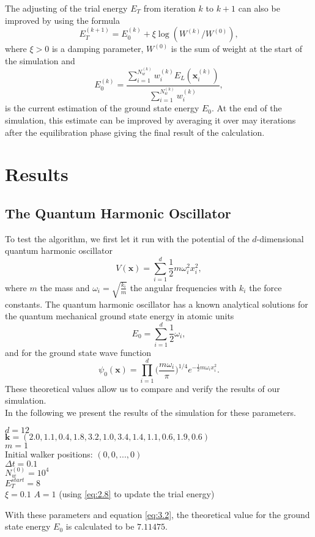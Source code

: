 \documentclass [12pt]{report}
\begin{document}
The adjusting of the trial energy $E_T$ from iteration $k$ to $k+1$ can also be improved by using the formula
\begin{equation}\label{eq:2.13} 
E_T^{(k+1)} = E_0^{(k)} + \xi \log(W^{(k)}/W^{(0)}),
\end{equation}
where $\xi > 0$ is a damping parameter, $W^{(0)}$ is the sum of weight at the start of the simulation and
\begin{equation}\label{eq:2.14} 
E_0^{(k)} = \frac{\sum_{i = 1}^{N_w^{(k)}} w_{i}^{(k)} E_L(\bm{x}_{i}^{(k)})}{\sum_{i = 1}^{N_w^{(k)}} w_{i}^{(k)} },
\end{equation}
is the current estimation of the ground state energy $E_0$. At the end of the simulation, this estimate can be improved by averaging it over may iterations after the equilibration phase giving the final result of the calculation.

\chapter{Results}
\section{The Quantum Harmonic Oscillator}
To test the algorithm, we first let it run with the potential of the $d$-dimensional quantum harmonic oscillator
\begin{equation}\label{eq:3.1} 
V(\bm{x}) = \sum_{i=1}^d \frac{1}{2} m \omega_i^2 x_i^2,
\end{equation}
where $m$ the mass and $\omega_i = \sqrt{\frac{k_i}{m}}$ the angular frequencies with $k_i$ the force constants. The quantum harmonic oscillator has a known analytical solutions for the quantum mechanical ground state energy in atomic units
\begin{equation}\label{eq:3.2} 
E_0 = \sum_{i=1}^d \frac{1}{2}\omega_i,
\end{equation}
and for the ground state wave function
\begin{equation}\label{eq:3.3} 
\psi_0(\bm{x}) = \prod_{i=1}^d \biggl(\frac{m \omega_i}{\pi}\biggr)^{1/4} e^{-\frac{1}{2} m \omega_i x_i^2}.
\end{equation}
These theoretical values allow us to compare and verify the results of our simulation.\\
In the following we present the results of the simulation for these parameters.

\begin{addmargin}[1cm]{1cm}
$d = 12$ \\
$\bm{k} = (2.0,  1.1,  0.4,  1.8,  3.2,  1.0,  3.4,  1.4,  1.1,  0.6,  1.9,  0.6 )$\\
$m =1$ \\
Initial walker positions: $(0,0,...,0)$\\
$\Delta t = 0.1$ \\
$N_w^{(0)} = 10^4$ \\
$E_T^{start} = 8$\\
$\xi = 0.1$
$A = 1$ (using \eqref{eq:2.8} to update the trial energy)\\
\end{addmargin}
With these parameters and equation \eqref{eq:3.2}, the theoretical value for the ground state energy $E_0$ is calculated to be $7.11475$.
\end{document}

